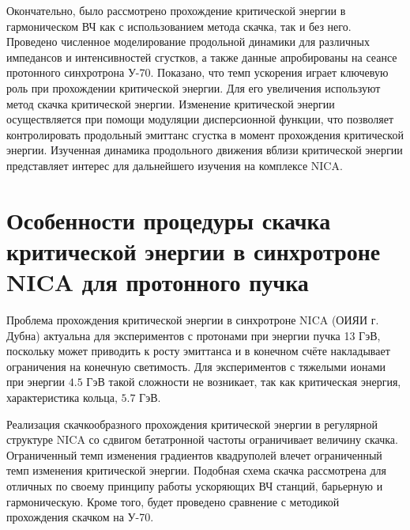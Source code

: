 \par Окончательно, было рассмотрено прохождение критической энергии в гармоническом ВЧ как с использованием метода скачка, так и без него. Проведено численное моделирование продольной динамики для различных импедансов и интенсивностей сгустков, а также данные апробированы на сеансе протонного синхротрона У-70. Показано, что темп ускорения играет ключевую роль при прохождении критической энергии. Для его увеличения используют метод скачка критической энергии. Изменение критической энергии осуществляется при помощи модуляции дисперсионной функции, что позволяет контролировать продольный эмиттанс сгустка в момент прохождения критической энергии. Изученная динамика продольного движения вблизи критической энергии представляет интерес для дальнейшего изучения на комплексе NICA.

\section{Особенности процедуры скачка критической энергии в синхротроне NICA для протонного пучка}

\par Проблема прохождения критической энергии в синхротроне NICA (ОИЯИ г. Дубна) актуальна для экспериментов с протонами при энергии пучка 13 ГэВ, поскольку может приводить к росту эмиттанса и в конечном счёте накладывает ограничения на конечную светимость. Для экспериментов с тяжелыми ионами при энергии $4.5$ ГэВ такой сложности не возникает, так как критическая энергия, характеристика кольца, $5.7$ ГэВ. 

\par Реализация скачкообразного прохождения критической энергии в регулярной структуре NICA со сдвигом бетатронной частоты ограничивает величину скачка. Ограниченный темп изменения градиентов квадруполей влечет ограниченный темп изменения критической энергии. Подобная схема скачка рассмотрена для отличных по своему принципу работы ускоряющих ВЧ станций, барьерную и гармоническую. Кроме того, будет проведено сравнение с методикой прохождения скачком на У-70.

